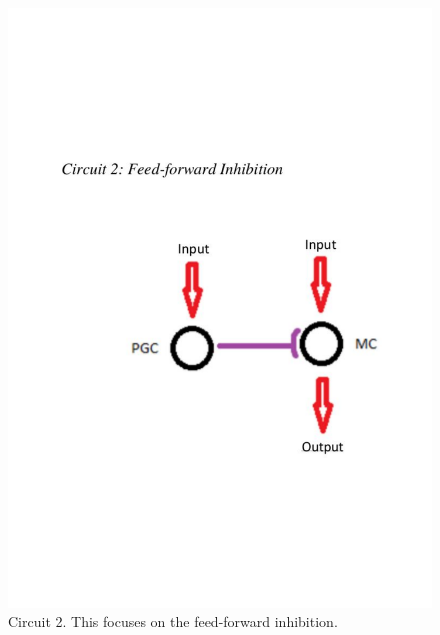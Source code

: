 \documentclass[11pt]{report}
\begin{document}
\begin{figure}[!h]
\centering
\includegraphics[trim={0 6cm 0 6cm},clip, scale=0.5]{Figures/Circuit_2.pdf}
\caption{Circuit 2. This focuses on the feed-forward inhibition.}
\label{fig:Circuit_2}
\end{figure} 
\newpage
\end{document}
